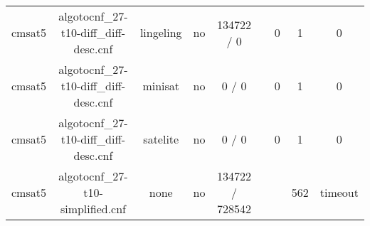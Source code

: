 \begin{appendices}
\begin{table}[p]
\begin{center}
\begin{tabular}{l|cccccccc}
  cmsat5                         & algotocnf\_27-t10-diff\_diff-desc.cnf & lingeling  & no    & 134722 / 0 &           & 0         & 1          & 0 \\ %
  cmsat5                         & algotocnf\_27-t10-diff\_diff-desc.cnf & minisat    & no    & 0 / 0      &           & 0         & 1          & 0 \\ %
  cmsat5                         & algotocnf\_27-t10-diff\_diff-desc.cnf & satelite   & no    & 0 / 0      &           & 0         & 1          & 0 \\ %
  cmsat5                         & algotocnf\_27-t10-simplified.cnf & none       & no    & 134722 / 728542 &           &           & 562        & timeout \\ %
    \end{tabular}
  \end{center}
\end{table}

\newpage


\end{appendices}

